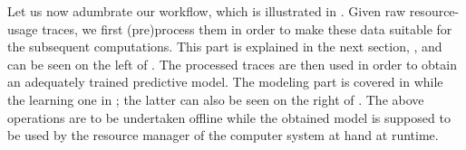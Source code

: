 Let us now adumbrate our workflow, which is illustrated in .
Given raw resource-usage traces, we first (pre)process them in order to make
these data suitable for the subsequent computations. This part is explained in
the next section, , and can be seen on the left of .
The processed traces are then used in order to obtain an adequately trained
predictive model. The modeling part is covered in  while the
learning one in ; the latter can also be seen on the right of
. The above operations are to be undertaken offline while the
obtained model is supposed to be used by the resource manager of the computer
system at hand at runtime.
